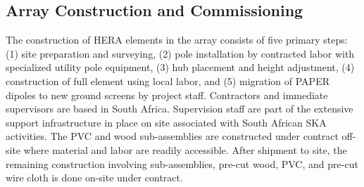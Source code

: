 \documentclass[preprint]{aastex}
\newcommand{\compress}{\vspace{-0.25in}}
\begin{document}
%
%
%

\compress
\subsection{Array Construction and Commissioning}

The construction of HERA elements in the array consists of five primary steps: 
(1) site preparation and surveying, (2) pole installation by contracted labor with specialized utility pole equipment,
(3) hub placement and height adjustment, (4) construction of full element using local labor,
and (5) migration of PAPER dipoles to new ground screens by project staff.
Contractors and immediate supervisors are based in South Africa.  Supervision staff 
are part of the extensive support infrastructure in place on site associated with South African SKA activities.
The PVC and wood sub-assemblies 
are constructed under contract off-site where material and labor are readily accessible.  After shipment to site, the
remaining construction involving sub-assemblies, pre-cut wood, PVC, and pre-cut wire cloth 
is done on-site under contract.  
\end{document}
